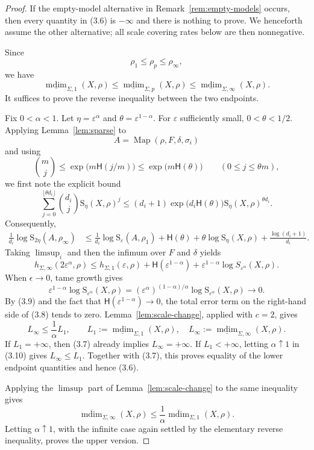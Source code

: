 \documentclass[12pt]{amsart}
\theoremstyle{definition}
\theoremstyle{remark}
\newcommand{\Map}{\operatorname{Map}}
\newcommand{\mdim}{\operatorname{mdim}}
\newcommand{\cH}{\mathsf H}
\begin{document}
\begin{proof}
If the empty-model alternative in Remark~\ref{rem:empty-models} occurs, then every quantity in (3.6) is $-\infty$ and there is nothing to prove. We henceforth assume the other alternative; all scale covering rates below are then nonnegative.

Since
\[
 \rho_1\leq\rho_p\leq\rho_\infty,
\]
 we have
\[
 \underline{\mdim}_{\Sigma,1}(X,\rho)
 \leq\underline{\mdim}_{\Sigma,p}(X,\rho)
 \leq\underline{\mdim}_{\Sigma,\infty}(X,\rho).
 \tag{3.7}
\]
It suffices to prove the reverse inequality between the two endpoints.

Fix $0<\alpha<1$. Let $\eta=\varepsilon^\alpha$ and $\theta=\varepsilon^{1-\alpha}$. For $\varepsilon$ sufficiently small, $0<\theta<1/2$. Applying Lemma~\ref{lem:sparse} to
\[
 A=\Map(\rho,F,\delta,\sigma_i)
\]
and using
\[
 \binom mj\leq \exp\bigl(m\cH(j/m)\bigr)
 \leq \exp\bigl(m\cH(\theta)\bigr)
 \qquad(0\leq j\leq\theta m),
\]
we first note the explicit bound
\[
 \sum_{j=0}^{\lfloor\theta d_i\rfloor}
 \binom{d_i}{j}\mathrm{S}_\eta(X,\rho)^j
 \leq (d_i+1)\exp\bigl(d_i\cH(\theta)\bigr)
 \mathrm{S}_\eta(X,\rho)^{\theta d_i}.
\]
Consequently,
\begin{align*}
 \frac1{d_i}\log \mathrm{S}_{2\eta}(A,\rho_\infty)
 &\leq \frac1{d_i}\log \mathrm{S}_\varepsilon(A,\rho_1)
 +\cH(\theta)
 +\theta\log \mathrm{S}_\eta(X,\rho)
 +\frac{\log(d_i+1)}{d_i}.
\end{align*}
Taking $\limsup_i$ and then the infimum over $F$ and $\delta$ yields
\[
 h_{\Sigma,\infty}(2\varepsilon^\alpha,\rho)
 \leq h_{\Sigma,1}(\varepsilon,\rho)
 +\cH(\varepsilon^{1-\alpha})
 +\varepsilon^{1-\alpha}
   \log S_{\varepsilon^\alpha}(X,\rho).
 \tag{3.8}
\]
When $\epsilon\to 0$, tame growth gives
\[
 \varepsilon^{1-\alpha}
 \log \mathrm{S}_{\varepsilon^\alpha}(X,\rho)
 = (\varepsilon^\alpha)^{(1-\alpha)/\alpha}
 \log \mathrm{S}_{\varepsilon^\alpha}(X,\rho)
 \longrightarrow0.
 \tag{3.9}
\]
By (3.9) and the fact that $\cH(\varepsilon^{1-\alpha})\to0$, the total error term on the right-hand side of (3.8) tends to zero. Lemma~\ref{lem:scale-change}, applied with $c=2$, gives
\[
 L_\infty
 \leq \frac1\alpha L_1,
 \qquad
 L_1:=\underline{\mdim}_{\Sigma,1}(X,\rho),
 \quad
 L_\infty:=\underline{\mdim}_{\Sigma,\infty}(X,\rho).
 \tag{3.10}
\]
If $L_1=+\infty$, then (3.7) already implies $L_\infty=+\infty$. If $L_1<+\infty$, letting $\alpha\uparrow1$ in (3.10) gives $L_\infty\leq L_1$. Together with (3.7), this proves equality of the lower endpoint quantities and hence (3.6).

Applying the $\limsup$ part of Lemma~\ref{lem:scale-change} to the same inequality gives
\[
 \overline{\mdim}_{\Sigma,\infty}(X,\rho)
 \leq \frac1\alpha
 \overline{\mdim}_{\Sigma,1}(X,\rho).
\]
Letting $\alpha\uparrow1$, with the infinite case again settled by the elementary reverse inequality, proves the upper version.
\end{proof}
\end{document}
